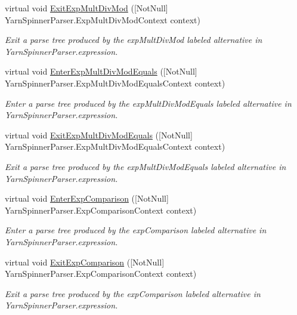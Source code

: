 \begin{DoxyCompactItemize}
virtual void \hyperlink{a00190_ac874c7fdb818e8f1d4a0ed8cb272804c}{Exit\-Exp\-Mult\-Div\-Mod} (\mbox{[}Not\-Null\mbox{]} Yarn\-Spinner\-Parser.\-Exp\-Mult\-Div\-Mod\-Context context)
\begin{DoxyCompactList}\small\item\em Exit a parse tree produced by the {\ttfamily exp\-Mult\-Div\-Mod} labeled alternative in Yarn\-Spinner\-Parser.\-expression. \end{DoxyCompactList}\item 
virtual void \hyperlink{a00190_aa9040fe56a7c7b7452c4284a1e13752a}{Enter\-Exp\-Mult\-Div\-Mod\-Equals} (\mbox{[}Not\-Null\mbox{]} Yarn\-Spinner\-Parser.\-Exp\-Mult\-Div\-Mod\-Equals\-Context context)
\begin{DoxyCompactList}\small\item\em Enter a parse tree produced by the {\ttfamily exp\-Mult\-Div\-Mod\-Equals} labeled alternative in Yarn\-Spinner\-Parser.\-expression. \end{DoxyCompactList}\item 
virtual void \hyperlink{a00190_aac772034f0fc8877ea587dc47e875997}{Exit\-Exp\-Mult\-Div\-Mod\-Equals} (\mbox{[}Not\-Null\mbox{]} Yarn\-Spinner\-Parser.\-Exp\-Mult\-Div\-Mod\-Equals\-Context context)
\begin{DoxyCompactList}\small\item\em Exit a parse tree produced by the {\ttfamily exp\-Mult\-Div\-Mod\-Equals} labeled alternative in Yarn\-Spinner\-Parser.\-expression. \end{DoxyCompactList}\item 
virtual void \hyperlink{a00190_a246642cc69e5c444342c9856893294db}{Enter\-Exp\-Comparison} (\mbox{[}Not\-Null\mbox{]} Yarn\-Spinner\-Parser.\-Exp\-Comparison\-Context context)
\begin{DoxyCompactList}\small\item\em Enter a parse tree produced by the {\ttfamily exp\-Comparison} labeled alternative in Yarn\-Spinner\-Parser.\-expression. \end{DoxyCompactList}\item 
virtual void \hyperlink{a00190_af8f026d529dcea66d5ac519ce404ed55}{Exit\-Exp\-Comparison} (\mbox{[}Not\-Null\mbox{]} Yarn\-Spinner\-Parser.\-Exp\-Comparison\-Context context)
\begin{DoxyCompactList}\small\item\em Exit a parse tree produced by the {\ttfamily exp\-Comparison} labeled alternative in Yarn\-Spinner\-Parser.\-expression. \end{DoxyCompactList}\item 

\end{DoxyCompactItemize}
